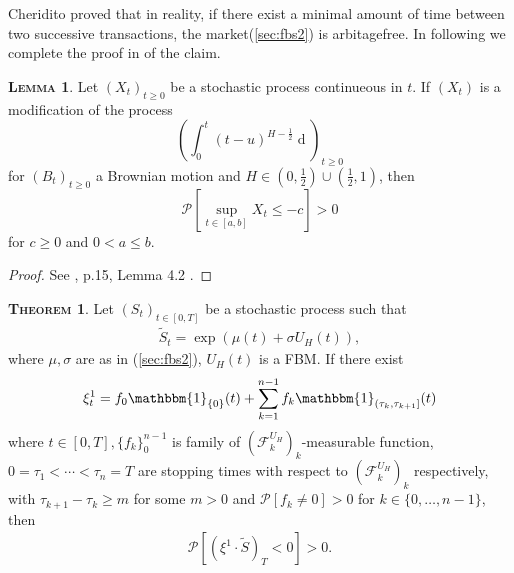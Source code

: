 \documentclass[a4paper, twoside, 11pt]{article}
\theoremstyle{definition}
\newtheorem{theorem}[definition]{\scshape Theorem}
\newtheorem{lemma}[definition]{\scshape Lemma}
\newcommand{\brkt}[1]{\left({#1} \right)}
\begin{document}
  Cheridito proved that in reality, if there exist a minimal amount of time between two successive transactions, the market(\ref{sec:fbs2}) is arbitagefree. In following we complete the proof in \cite{chridito} of the claim.
\begin{lemma}
  Let $(X_t)_{t\ge 0}$ be a stochastic process continueous in $t$. If $(X_t)$ is a modification of the process 
  $$
  \brkt{\int_0^t (t-u)^{H-\frac{1}{2}}\mathop{dB_u}}_{t\ge 0}
  $$
  for $(B_t)_{t\ge 0}$ a Brownian motion and $H\in (0, \frac{1}{2})\cup(\frac{1}{2}, 1)$,
  then 
  $$
  \mathcal{P}[\sup\limits_{t\in[a,b]} X_t \le -c] > 0
  $$
  for $c \ge 0$ and $0< a\le b$.
  \label{sec:lll} 
\end{lemma}

\begin{proof}
  See \cite{chridito}, p.15, Lemma 4.2 .
\end{proof}
\begin{theorem}
  Let $(S_t)_{t\in[0, T]}$ be a stochastic process such that
  \begin{eqnarray}
	\tilde{S}_t = \exp\brkt{\mu(t) + \sigma U_H(t)},
	\label{sec:fbs}
  \end{eqnarray}
  where $\mu, \sigma$ are as in (\ref{sec:fbs2}), $U_H(t)$ is a FBM. If there exist
  \begin{eqnarray*}
  \xi^1_t = f_0\mathbbm{1}_{\{0\}}(t)+\sum_{k=1}^{n-1} f_k \mathbbm{1}_{(\tau_k, \tau_{k+1}]}(t)
  \end{eqnarray*}
  where $t\in[0, T], \{f_k\}_0^{n-1}$ is family of  $(\mathcal{F}^{U_H}_k)_k $-measurable function, $0 = \tau_1 < \cdots <\tau_n = T$ are stopping times with respect to $(\mathcal{F}^{U_H}_k)_k $ respectively,  with $\tau_{k+1} - \tau_k\ge m$ for some $m>0$ and $\mathcal{P}[f_k\neq 0]>0$ for $k\in\{0,\dots,n-1\}$, then
  \begin{eqnarray*}
	\mathcal{P}[(\xi^1 \cdot \tilde{S})_T < 0] > 0.
  \end{eqnarray*}
	\label{sec:claim}
\end{theorem}
\end{document}
